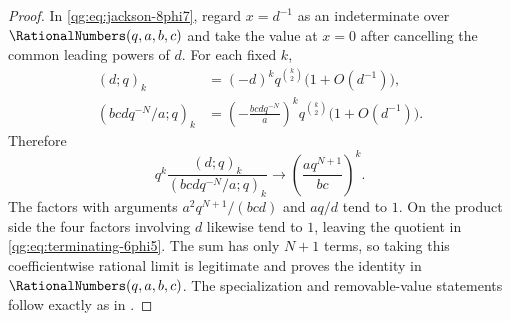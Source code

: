 \begin{proof}
In \eqref{qg:eq:jackson-8phi7}, regard $x=d^{-1}$ as an indeterminate over
$\RationalNumbers(q,a,b,c)$ and take the value at $x=0$ after cancelling the
common leading powers of $d$.  For each fixed $k$,
\begin{align*}
(d;q)_k
 &=(-d)^kq^{\binom{k}{2}}\bigl(1+O(d^{-1})\bigr),\\
(bcdq^{-N}/a;q)_k
 &=\left(-\frac{bcdq^{-N}}a\right)^k
 q^{\binom{k}{2}}\bigl(1+O(d^{-1})\bigr).
\end{align*}
Therefore
\[
 q^k\frac{(d;q)_k}{(bcdq^{-N}/a;q)_k}
 \longrightarrow
 \left(\frac{aq^{N+1}}{bc}\right)^k.
\]
The factors with arguments $a^2q^{N+1}/(bcd)$ and $aq/d$ tend to $1$.
On the product side the four factors involving $d$ likewise tend to $1$,
leaving the quotient in \eqref{qg:eq:terminating-6phi5}.  The sum has only
$N+1$ terms, so taking this coefficientwise rational limit is legitimate and
proves the identity in $\RationalNumbers(q,a,b,c)$.  The specialization and
removable-value statements follow exactly as in
.
\end{proof}
